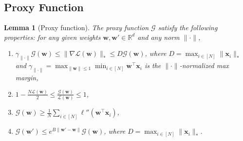 \documentclass{article} %
\theoremstyle{plain}
\newtheorem{lemma}[theorem]{Lemma}
\theoremstyle{definition}
\theoremstyle{remark}
\def\gG{{\mathcal{G}}}
\newcommand{\Ls}{\mathcal{L}}
\def\bx{{\mathbf x}}
\def\bw{{\mathbf w}}
\begin{document}
\subsection{Proxy Function}
\begin{lemma}[Proxy function]\label{lemma:proxy}
    The proxy function $\gG$ satisfy the following properties: for any given weights $\bw, \bw'\in \mathbb R^d$ and any norm $\|\cdot\|$, 
    \begin{enumerate}[label=(\alph*)]
        \item $ \gamma_{\|\cdot\|} \gG(\bw)\leq \|\nabla \Ls(\bw)\|_* \leq D\gG(\bw)$, where $D = \max_{i \in [N]} \|\bx_i\|_*$ and $\gamma_{\|\cdot\|}=\max_{\|\bw\|\leq1} \min_{i \in [N]}\bw^\top\bx_i$ is the $\|\cdot\|$-normalized max margin,
        \item $1-\frac{N\Ls(\bw)}{2} \leq \frac{\gG(\bw)}{\Ls(\bw)}\leq 1$,
        \item $\gG(\bw) \geq \frac{1}{N}\sum_{i\in [N]}\ell''(\bw^\top \bx_i)$,
        \item $\gG(\bw') \leq e^{B\|\bw'-\bw\|}\gG(\bw)$, where $D = \max_{i \in [N]} \|\bx_i\|_*$.
    \end{enumerate}
\end{lemma}
\end{document}
